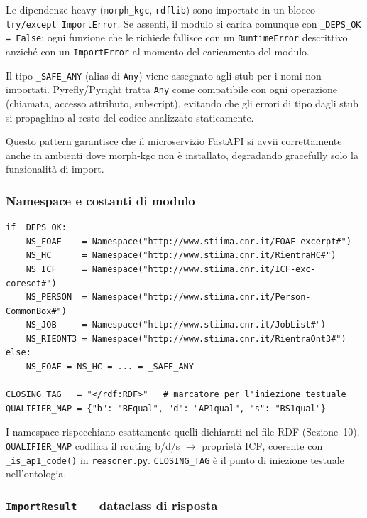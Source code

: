 \documentclass[a4paper,12pt]{article}
\begin{document}
\noindent Le dipendenze heavy (\texttt{morph\_kgc}, \texttt{rdflib}) sono importate
in un blocco \texttt{try/except ImportError}. Se assenti, il modulo si
carica comunque con \texttt{\_DEPS\_OK = False}: ogni funzione che le
richiede fallisce con un \texttt{RuntimeError} descrittivo anzich\'{e}
con un \texttt{ImportError} al momento del caricamento del modulo.

Il tipo \texttt{\_SAFE\_ANY} (alias di \texttt{Any}) viene assegnato
agli stub per i nomi non importati. Pyrefly/Pyright tratta \texttt{Any}
come compatibile con ogni operazione (chiamata, accesso attributo,
subscript), evitando che gli errori di tipo dagli stub si propaghino
al resto del codice analizzato staticamente.

Questo pattern garantisce che il microservizio FastAPI si avvii
correttamente anche in ambienti dove morph-kgc non \`{e} installato,
degradando gracefully solo la funzionalit\`{a} di import.

\subsubsection{Namespace e costanti di modulo}
\vspace{2pt}
\begin{lstlisting}[caption={Namespace rdflib e costanti di modulo.}]
if _DEPS_OK:
    NS_FOAF    = Namespace("http://www.stiima.cnr.it/FOAF-excerpt#")
    NS_HC      = Namespace("http://www.stiima.cnr.it/RientraHC#")
    NS_ICF     = Namespace("http://www.stiima.cnr.it/ICF-exc-coreset#")
    NS_PERSON  = Namespace("http://www.stiima.cnr.it/Person-CommonBox#")
    NS_JOB     = Namespace("http://www.stiima.cnr.it/JobList#")
    NS_RIEONT3 = Namespace("http://www.stiima.cnr.it/RientraOnt3#")
else:
    NS_FOAF = NS_HC = ... = _SAFE_ANY

CLOSING_TAG   = "</rdf:RDF>"   # marcatore per l'iniezione testuale
QUALIFIER_MAP = {"b": "BFqual", "d": "AP1qual", "s": "BS1qual"}
\end{lstlisting}

\noindent I namespace rispecchiano esattamente quelli dichiarati nel file RDF
(Sezione~10). \texttt{QUALIFIER\_MAP} codifica il routing
b/d/s $\rightarrow$ propriet\`{a} ICF, coerente con
\texttt{\_is\_ap1\_code()} in \texttt{reasoner.py}.
\texttt{CLOSING\_TAG} \`{e} il punto di iniezione testuale nell'ontologia.

\subsubsection{\texttt{ImportResult} --- dataclass di risposta}
\end{document}

